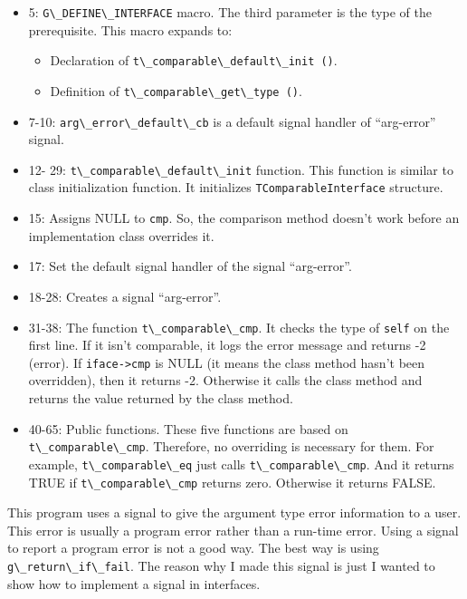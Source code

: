 \begin{itemize}
\tightlist
\item
  5: \passthrough{\lstinline!G\_DEFINE\_INTERFACE!} macro. The third
  parameter is the type of the prerequisite. This macro expands to:

  \begin{itemize}
  \tightlist
  \item
    Declaration of
    \passthrough{\lstinline!t\_comparable\_default\_init ()!}.
  \item
    Definition of \passthrough{\lstinline!t\_comparable\_get\_type ()!}.
  \end{itemize}
\item
  7-10: \passthrough{\lstinline!arg\_error\_default\_cb!} is a default
  signal handler of ``arg-error'' signal.
\item
  12- 29: \passthrough{\lstinline!t\_comparable\_default\_init!}
  function. This function is similar to class initialization function.
  It initializes \passthrough{\lstinline!TComparableInterface!}
  structure.
\item
  15: Assigns NULL to \passthrough{\lstinline!cmp!}. So, the comparison
  method doesn't work before an implementation class overrides it.
\item
  17: Set the default signal handler of the signal ``arg-error''.
\item
  18-28: Creates a signal ``arg-error''.
\item
  31-38: The function \passthrough{\lstinline!t\_comparable\_cmp!}. It
  checks the type of \passthrough{\lstinline!self!} on the first line.
  If it isn't comparable, it logs the error message and returns -2
  (error). If \passthrough{\lstinline!iface->cmp!} is NULL (it means the
  class method hasn't been overridden), then it returns -2. Otherwise it
  calls the class method and returns the value returned by the class
  method.
\item
  40-65: Public functions. These five functions are based on
  \passthrough{\lstinline!t\_comparable\_cmp!}. Therefore, no overriding
  is necessary for them. For example,
  \passthrough{\lstinline!t\_comparable\_eq!} just calls
  \passthrough{\lstinline!t\_comparable\_cmp!}. And it returns TRUE if
  \passthrough{\lstinline!t\_comparable\_cmp!} returns zero. Otherwise
  it returns FALSE.
\end{itemize}

This program uses a signal to give the argument type error information
to a user. This error is usually a program error rather than a run-time
error. Using a signal to report a program error is not a good way. The
best way is using \passthrough{\lstinline!g\_return\_if\_fail!}. The
reason why I made this signal is just I wanted to show how to implement
a signal in interfaces.

